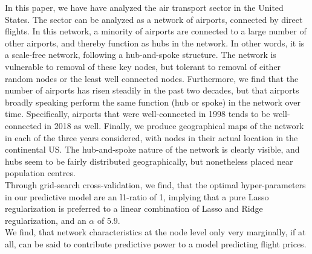 \label{sec:conclusion}
In this paper, we have have analyzed the air transport sector in the United States. The sector can be analyzed as a network of airports, connected by direct flights. In this network, a minority of airports are connected to a large number of other airports, and thereby function as hubs in the network. In other words, it is a scale-free network, following a hub-and-spoke structure. The network is vulnerable to removal of these key nodes, but tolerant to removal of either random nodes or the least well connected nodes. Furthermore, we find that the number of airports has risen steadily in the past two decades, but that airports broadly speaking perform the same function (hub or spoke) in the network over time. Specifically, airports that were well-connected in 1998 tends to be well-connected in 2018 as well. Finally, we produce geographical maps of the network in each of the three years considered, with nodes in their actual location in the continental US. The hub-and-spoke nature of the network is clearly visible, and hubs seem to be fairly distributed geographically, but nonetheless placed near population centres. \\

Through grid-search cross-validation, we find, that the optimal hyper-parameters in our predictive model are an l1-ratio of 1, implying that a pure Lasso regularization is preferred to a linear combination of Lasso and Ridge regularization, and an $\alpha$ of 5.9. \\

We find, that network characteristics at the node level only very marginally, if at all, can be said to contribute predictive power to a model predicting flight prices. \\ 
